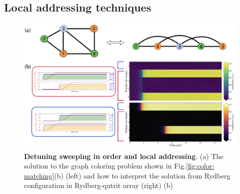\documentclass[%
 reprint,
nofootinbib,
 amsmath,amssymb,
 aps,
floatfix,
]{revtex4-2}
\begin{document}
\subsection{Local addressing techniques}
\begin{figure}[t!]
    \centering
    \includegraphics[width=13cm]{picture/case1_ultimate.png}
    \caption{\textbf{Detuning sweeping in order and local addressing}. (a) The solution to the graph coloring problem shown in Fig.\ref{fig:color-matching}(b) (left) and how to interpret the solution from Rydberg configuration in Rydberg-qutrit array (right) (b) }
    \label{fig:case1_ultimate}
\end{figure}
\end{document}
